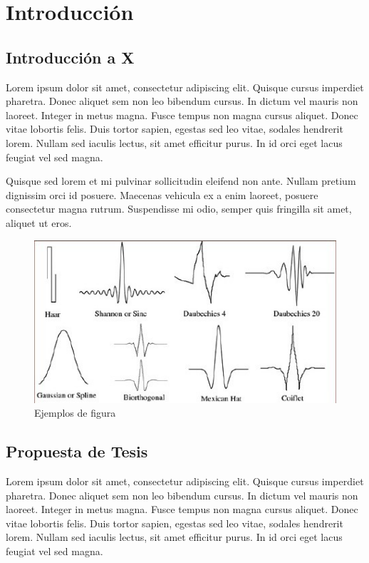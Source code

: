 
\chapter{Introducción}

  \section{Introducción a X}

  Lorem ipsum dolor sit amet, consectetur adipiscing elit. Quisque cursus imperdiet
  pharetra. Donec aliquet sem non leo bibendum cursus. In dictum vel mauris non
  laoreet. Integer in metus magna. Fusce tempus non magna cursus aliquet. Donec
  vitae lobortis felis. Duis tortor sapien, egestas sed leo vitae, sodales hendrerit
  lorem. Nullam sed iaculis lectus, sit amet efficitur purus. In id orci eget lacus
  feugiat vel sed magna.

  Quisque sed lorem et mi pulvinar sollicitudin eleifend non ante. Nullam pretium
  dignissim orci id posuere. Maecenas vehicula ex a enim laoreet, posuere consectetur
  magna rutrum. Suspendisse mi odio, semper quis fringilla sit amet, aliquet ut eros.

  \begin{figure}[!htb]
    \begin{center}
    	\includegraphics[width=15cm]{./figuras/wavelets.jpg}
    	\caption{Ejemplos de figura}
    \end{center}
    \label{fig:figura}
  \end{figure}

  \section{Propuesta de Tesis}

  Lorem ipsum dolor sit amet, consectetur adipiscing elit. Quisque cursus imperdiet
  pharetra. Donec aliquet sem non leo bibendum cursus. In dictum vel mauris non
  laoreet. Integer in metus magna. Fusce tempus non magna cursus aliquet. Donec
  vitae lobortis felis. Duis tortor sapien, egestas sed leo vitae, sodales hendrerit
  lorem. Nullam sed iaculis lectus, sit amet efficitur purus. In id orci eget lacus
  feugiat vel sed magna.


